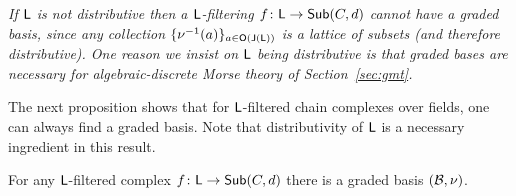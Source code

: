 \begin{rem}
{\em
  If ${\mathsf L}$ is not distributive then a ${\mathsf L}$-filtering $f\colon {\mathsf L}\to \mathsf{Sub}(C,d)$ cannot have a graded basis, since any collection $\{\nu^{-1}(a)\}_{a\in {\mathsf O}({\mathsf J}({\mathsf L}))}$ is a lattice of subsets (and therefore distributive).  One reason we insist on ${\mathsf L}$ being distributive is that graded bases are necessary for algebraic-discrete Morse theory of Section~\ref{sec:gmt}.
  }
\end{rem}

The next proposition shows that for ${\mathsf L}$-filtered chain complexes over fields, one can always find a graded basis.  Note that distributivity of ${\mathsf L}$ is a necessary ingredient in this result.

\begin{prop}\label{prop:bases}
For any ${\mathsf L}$-filtered complex $f\colon {\mathsf L}\to \mathsf{Sub}(C,d)$ there is a graded basis $({\mathcal B},\nu)$.
\end{prop}
